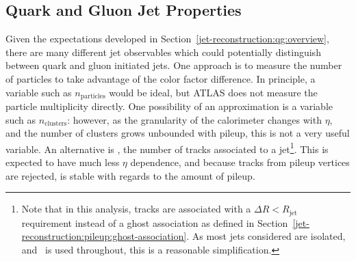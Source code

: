 

\subsection{Quark and Gluon Jet Properties}
\label{jet-reconstruction:qg:properties}

Given the expectations developed in Section~\ref{jet-reconstruction:qg:overview}, there are many different jet observables which could potentially distinguish between quark and gluon initiated jets. One approach is to measure the number of particles to take advantage of the color factor difference. In principle, a variable such as $n_\mathrm{particles}$ would be ideal, but ATLAS does not measure the particle multiplicity directly. One possibility of an approximation is a variable such as $n_\mathrm{clusters}$: however, as the granularity of the calorimeter changes with $\eta$, and the number of clusters grows unbounded with pileup, this is not a very useful variable. An alternative is \ntrk, the number of tracks associated to a jet\footnote{Note that in this analysis, tracks are associated with a $\Delta R < R_\mathrm{jet}$ requirement instead of a ghost association as defined in Section~\ref{jet-reconstruction:pileup:ghost-association}. As most jets considered are isolated, and \antikt~is used throughout, this is a reasonable simplification.}. This is expected to have much less $\eta$ dependence, and because tracks from pileup vertices are rejected, is stable with regards to the amount of pileup.

